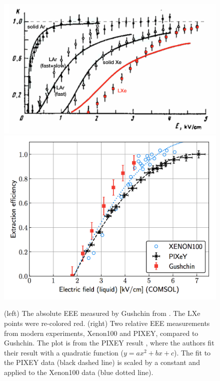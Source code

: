 \begin{figure}[htbp]
\begin{center}
\includegraphics[width=\halffig]{figures/etrains/gushchin_eee.png}
\includegraphics[width=\halffig]{figures/etrains/modern_eee.png}
\caption{(left) The absolute \acs{EEE} measured by Gushchin from \cite{Gushchin1982}. The \acs{LXe} points were re-colored red. (right) Two relative \acs{EEE} measurements from modern experiments, Xenon100 and PIXEY, compared to Gushchin. The plot is from the PIXEY result \cite{Edwards2018}, where the authors fit their result with a quadratic function ($y=ax^{2} + bx + c$). The fit to the PIXEY data (black dashed line) is scaled by a constant and applied to the Xenon100 data (blue dotted line). }
\label{fig:eee}
\end{center}
\end{figure}

